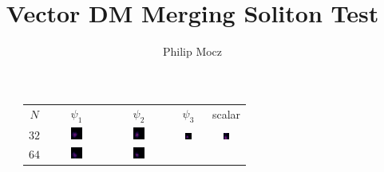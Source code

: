 \documentclass{article}
\title{Vector DM Merging Soliton Test}
\author{Philip Mocz}
\begin{document}
\maketitle

\begin{figure}[ht]
\begin{tabular}{cccc|c}
$N$ & $\psi_1$ & $\psi_2$ & $\psi_3$ & scalar\\
$32$ & 
\includegraphics[width=0.22\textwidth]{s42r32s20psi1.png} &
\includegraphics[width=0.22\textwidth]{s42r32s20psi2.png} &
\includegraphics[width=0.22\textwidth]{s42r32s20psi3.png} &
\includegraphics[width=0.22\textwidth]{s42r32s20psi1_scalar.png} \\
$64$ & 
\includegraphics[width=0.22\textwidth]{s42r64s20psi1.png} &
\includegraphics[width=0.22\textwidth]{s42r64s20psi2.png} &

\end{tabular}
\end{figure}
\end{document}
